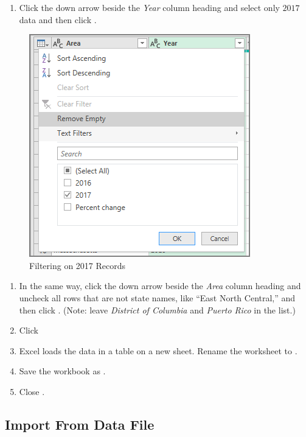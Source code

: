 \begin{enumerate}[resume]
	\item Click the down arrow beside the \textit{Year} column heading and select only $ 2017 $ data and then click .
\end{enumerate}

\begin{figure}[H]
	\centering
	\includegraphics[width=\maxwidth{.75\linewidth}]{gfx/ch07_fig02f}
	\caption{Filtering on 2017 Records}
	\label{07:fig02f}
\end{figure}

\begin{enumerate}[resume]
	\item In the same way, click the down arrow beside the \textit{Area} column heading and uncheck all rows that are not state names, like ``East North Central,'' and then click . (Note: leave \textit{District of Columbia} and \textit{Puerto Rico} in the list.)
	\item Click 
	\item Excel loads the data in a table on a new sheet. Rename the worksheet to .
	\item Save the workbook as .
	\item Close .
\end{enumerate}

\subsection{Import From Data File}\label{07:ImportFromDataFile}

